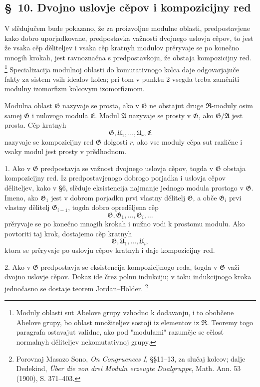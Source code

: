 \documentclass[11pt]{article}
\providecommand{\mR}{\mathfrak{R}}
\providecommand{\mG}{\mathfrak{G}}
\providecommand{\mU}{\mathfrak{U}}
\providecommand{\mE}{\mathfrak{E}}
\providecommand{\mA}{\mathfrak{A}}
\begin{document}
\setcounter{footnote}{32}

\subsection*{\S~10. Dvojno uslovje cěpov i kompozicijny red}

V slědujučem bude pokazano, že za proizvoljne modulne oblasti, predpostavjene kako dobro uporjadkovane, predpostavka važnosti dvojnego uslovja cěpov, to jest že vsaka cěp děliteljev i vsaka cěp kratnyh modulov prěryvaje se po konečno mnogih krokah, jest ravnoznačna s predpostavkoju, že obstaja kompozicijny red.
\footnote{Moduly oblasti sut Abelove grupy vzhodno k dodavanju, i to obobčene Abelove grupy, bo oblast množiteljev sostoji iz elementov iz $\mR$. Teoremy togo paragrafa ostavajut validne, ako pod "modulami" razuměje se cělosť normalnyh děliteljev nekomutativnoj grupy.}
Specializacija modulnoj oblasti do komutativnogo kolca daje odgovarjajuče fakty za sistem vsih idealov kolca; pri tom v punktu 2 vsegda treba zaměniti modulny izomorfizm kolcovym izomorfizmom.

Modulna oblast $\mG$ nazyvaje se prosta, ako v $\mG$ ne obstajut druge $\mR$-moduly osim samej $\mG$ i nulovogo modula $\mE$. Modul $\mA$ nazyvaje se prosty v $\mG$, ako $\mG/\mA$ jest prosta. Cěp kratnyh
\[
        \mG,\mU_1,\ldots,\mU_r,\mE
\]
nazyvaje se kompozicijny red $\mG$ dolgosti $r$, ako vse moduly cěpa sut različne i vsaky modul jest prosty v prědhodnom.

1. Ako v $\mG$ predpostavja se važnost dvojnego uslovja cěpov, togda v $\mG$ obstaja kompozicijny red. Iz predpostavjenogo dobrogo porjadka i uslovja cěpov děliteljev, kako v §6, slěduje eksistencija najmanje jednogo modula prostogo v $\mG$. Imeno, ako $\mG_1$ jest v dobrom porjadku prvi vlastny dělitelj $\mG$, a obče $\mG_i$ prvi vlastny dělitelj $\mG_{i-1}$, togda dobro opreděljena cěp
\[
        \mG,\mG_1,\ldots,\mG_i,\ldots
\]
prěryvaje se po konečno mnogih krokah i nužno vodi k prostomu modulu. Ako povtoriti taj krok, dostajemo cěp kratnyh
\[
        \mG,\mU_1,\ldots,\mU_i,
\]
ktora se prěryvaje po uslovju cěpov kratnyh i daje kompozicijny red.

2. Ako v $\mG$ predpostavja se eksistencija kompozicijnogo reda, togda v $\mG$ važi dvojno uslovje cěpov. Dokaz ide črez polnu indukciju; v toku indukcijnogo kroka jednočasno se dostaje teorem Jordan--Hölder.
\footnote{Porovnaj Masazo Sono, \emph{On Congruences I}, §§11--13, za slučaj kolcov; dalje Dedekind, \emph{Über die von drei Moduln erzeugte Dualgruppe}, Math. Ann. 53 (1900), S. 371--403.}
\end{document}
